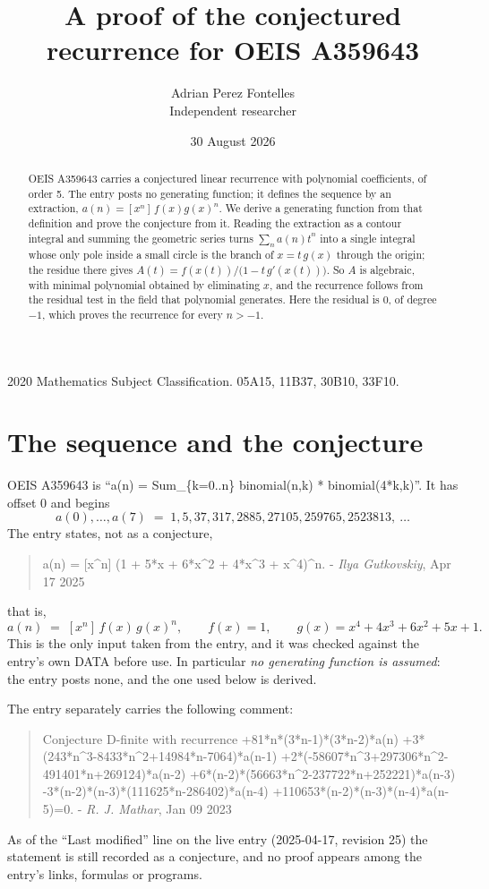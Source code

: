 \documentclass[11pt,a4paper]{article}
\title{A proof of the conjectured recurrence for OEIS A359643}
\author{Adrian Perez Fontelles\\ \small Independent researcher}
\date{30 August 2026}
\theoremstyle{plain}
\theoremstyle{definition}
\begin{document}
\maketitle

\begin{abstract}
OEIS A359643 carries a conjectured linear recurrence with polynomial coefficients, of
order 5. The entry posts no generating function; it defines the sequence by an
extraction, $a(n)=[x^{n}]\,f(x)g(x)^{n}$. We derive a generating function from that
definition and prove the conjecture from it. Reading the extraction as a contour integral
and summing the geometric series turns $\sum_{n}a(n)t^{n}$ into a single integral whose
only pole inside a small circle is the branch of $x=t\,g(x)$ through the origin; the
residue there gives $A(t)=f(x(t))/\bigl(1-t\,g'(x(t))\bigr)$. So $A$ is algebraic, with
minimal polynomial obtained by eliminating $x$, and the recurrence follows from the
residual test in the field that polynomial generates. Here the residual is
$0$, of degree $-1$, which proves the recurrence for every $n>-1$.
\end{abstract}

\noindent\small 2020 Mathematics Subject Classification. 05A15, 11B37, 30B10, 33F10.\normalsize

\section{The sequence and the conjecture}

OEIS A359643 is ``a(n) = Sum\_\{k=0..n\} binomial(n,k) * binomial(4*k,k)''. It has offset $0$ and begins
\[
a(0),\dots,a(7)\;=\;1, 5, 37, 317, 2885, 27105, 259765, 2523813,\ \dots
\]
The entry states, not as a conjecture,
\begin{quote}\small
a(n) = [x\^{}n] (1 + 5*x + 6*x\^{}2 + 4*x\^{}3 + x\^{}4)\^{}n. - \emph{Ilya Gutkovskiy}, Apr 17 2025
\end{quote}
that is,
\begin{equation}\label{eq:def}
a(n)\;=\;[x^{n}]\,f(x)\,g(x)^{n},
\qquad f(x)=1,\qquad g(x)=x^{4} + 4 x^{3} + 6 x^{2} + 5 x + 1 .
\end{equation}
This is the only input taken from the entry, and it was checked against the entry's own
DATA before use. In particular \emph{no generating function is assumed}: the entry posts
none, and the one used below is derived.

The entry separately carries the following comment:
\begin{quote}\small
Conjecture D-finite with recurrence +81*n*(3*n-1)*(3*n-2)*a(n) +3*(243*n\^{}3-8433*n\^{}2+14984*n-7064)*a(n-1) +2*(-58607*n\^{}3+297306*n\^{}2-491401*n+269124)*a(n-2) +6*(n-2)*(56663*n\^{}2-237722*n+252221)*a(n-3) -3*(n-2)*(n-3)*(111625*n-286402)*a(n-4) +110653*(n-2)*(n-3)*(n-4)*a(n-5)=0. - \emph{R. J. Mathar}, Jan 09 2023
\end{quote}
As of the ``Last modified'' line on the live entry (2025-04-17, revision 25) the
statement is still recorded as a conjecture, and no proof appears among the entry's links,
formulas or programs.
\end{document}
